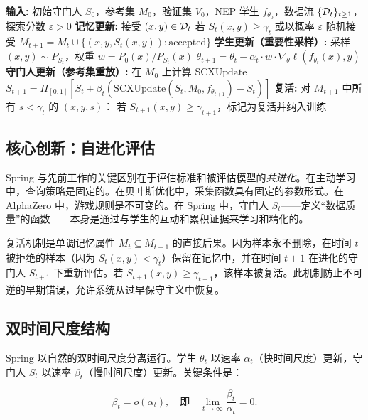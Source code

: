 \begin{algorithm}[ht]
\caption{Spring 自进化守门人}
\label{alg:spring}
\begin{algorithmic}[1]
\State \textbf{输入:} 初始守门人 $S_0$，参考集 $M_0$，验证集 $V_0$，NEP 学生 $f_{\theta_0}$，数据流 $\{\mathcal{D}_t\}_{t \geq 1}$，探索分数 $\varepsilon > 0$
    \State \textbf{记忆更新:} 接受 $(x,y) \in \mathcal{D}_{t}$ 若 $S_t(x,y) \geq \gamma_t$ 或以概率 $\varepsilon$ 随机接受
    \State $M_{t+1} = M_t \cup \{(x, y, S_t(x,y)) : \text{accepted}\}$
    \State \textbf{学生更新（重要性采样）:} 采样 $(x, y) \sim P_{S_t}$，权重 $w = P_0(x)/P_{S_t}(x)$
    \State $\theta_{t+1} = \theta_t - \alpha_t \cdot w \cdot \nabla_\theta \ell(f_{\theta_t}(x), y)$
    \State \textbf{守门人更新（参考集重放）:} 在 $M_0$ 上计算 $\text{SCXUpdate}$
    \State $S_{t+1} = \Pi_{[0,1]}[S_t + \beta_t (\text{SCXUpdate}(S_t, M_0, f_{\theta_{t+1}}) - S_t)]$
    \State \textbf{复活:} 对 $M_{t+1}$ 中所有 $s < \gamma_t$ 的 $(x, y, s)$：
    \State \quad 若 $S_{t+1}(x,y) \geq \gamma_{t+1}$，标记为复活并纳入训练
\EndFor
\end{algorithmic}
\end{algorithm}

\subsection{核心创新：自进化评估}

Spring 与先前工作的关键区别在于评估标准和被评估模型的\textit{共进化}。在主动学习中，查询策略是固定的。在贝叶斯优化中，采集函数具有固定的参数形式。在 AlphaZero 中，游戏规则是不可变的。在 Spring 中，守门人 $S_t$——定义``数据质量''的函数——本身是通过与学生的互动和累积证据来学习和精化的。

复活机制是单调记忆属性 $M_t \subseteq M_{t+1}$ 的直接后果。因为样本永不删除，在时间 $t$ 被拒绝的样本（因为 $S_t(x,y) < \gamma_t$）保留在记忆中，并在时间 $t+1$ 在进化的守门人 $S_{t+1}$ 下重新评估。若 $S_{t+1}(x,y) \geq \gamma_{t+1}$，该样本被复活。此机制防止不可逆的早期错误，允许系统从过早保守主义中恢复。

\subsection{双时间尺度结构}

Spring 以自然的双时间尺度分离运行。学生 $\theta_t$ 以速率 $\alpha_t$（快时间尺度）更新，守门人 $S_t$ 以速率 $\beta_t$（慢时间尺度）更新。关键条件是：

\begin{equation}\label{eq:twotimescale}
    \beta_t = o(\alpha_t), \quad \text{即} \quad \lim_{t \to \infty} \frac{\beta_t}{\alpha_t} = 0.
\end{equation}

